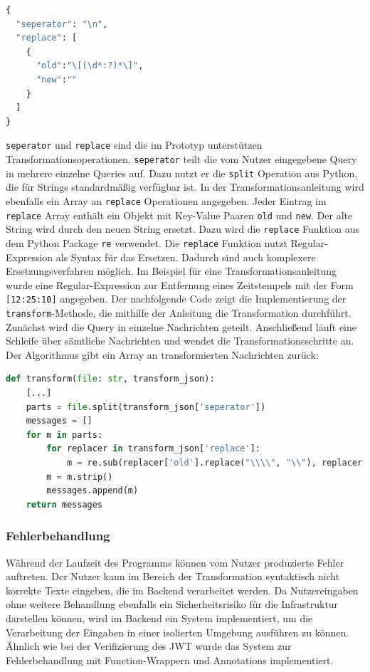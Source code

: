 \begin{lstlisting}[language=Python, caption={Beispiel einer Transformationsanleitung}]
{
  "seperator": "\n",
  "replace": [
    {
      "old":"\[(\d*:?)*\]",
      "new":""
    }
  ]
}
\end{lstlisting}

\texttt{seperator} und \texttt{replace} sind die im Prototyp unterstützen Transformationsoperationen. \texttt{seperator} teilt die vom Nutzer eingegebene Query in mehrere einzelne Queries auf. Dazu nutzt er die \texttt{split} Operation aus Python, die für Strings standardmäßig verfügbar ist. In der Transformationsanleitung wird ebenfalls ein Array an \texttt{replace} Operationen angegeben. Jeder Eintrag im \texttt{replace} Array enthält ein Objekt mit Key-Value Paaren \texttt{old} und \texttt{new}. Der alte String wird durch den neuen String ersetzt. Dazu wird die \texttt{replace} Funktion aus dem Python Package \texttt{re} verwendet. Die \texttt{replace} Funktion nutzt Regular-Expression als Syntax für das Ersetzen. Dadurch sind auch komplexere Ersetzungsverfahren möglich. Im Beispiel für eine Transformationsanleitung wurde eine Regular-Expression zur Entfernung eines Zeitstempels mit der Form \texttt{[12:25:10]} angegeben. Der nachfolgende Code zeigt die Implementierung der \texttt{transform}-Methode, die mithilfe der Anleitung die Transformation durchführt. Zunächst wird die Query in einzelne Nachrichten geteilt. Anschließend läuft eine Schleife über sämtliche Nachrichten und wendet die Transformationsschritte an. Der Algorithmus gibt ein Array an transformierten Nachrichten zurück:

\begin{lstlisting}[language=Python, caption={Transformationsalgorithmus}]
def transform(file: str, transform_json):
    [...]
    parts = file.split(transform_json['seperator'])
    messages = []
    for m in parts:
        for replacer in transform_json['replace']:
            m = re.sub(replacer['old'].replace("\\\\", "\\"), replacer['new'], m)
        m = m.strip()
        messages.append(m)
    return messages

\end{lstlisting}

\subsubsection{Fehlerbehandlung}
Während der Laufzeit des Programms können vom Nutzer produzierte Fehler auftreten. Der Nutzer kann im Bereich der Transformation syntaktisch nicht korrekte Texte eingeben, die im Backend verarbeitet werden. Da Nutzereingaben ohne weitere Behandlung ebenfalls ein Sicherheitsrisiko für die Infrastruktur darstellen können, wird im Backend ein System implementiert, um die Verarbeitung der Eingaben in einer isolierten Umgebung ausführen zu können. Ähnlich wie bei der Verifizierung des JWT wurde das System zur Fehlerbehandlung mit Function-Wrappern und Annotations implementiert. 

